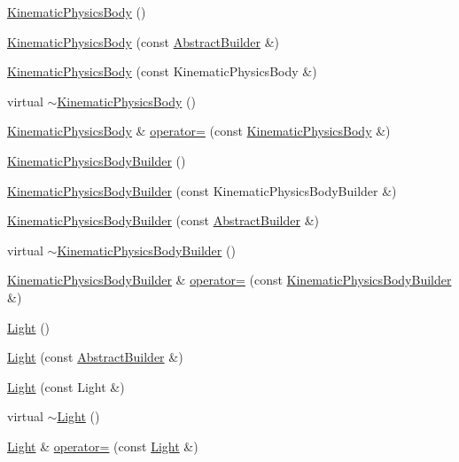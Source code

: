 \begin{DoxyCompactItemize}
\item 
\hyperlink{namespacejli_a7a3913d5239a7a26f7b249c8352cfb7e}{Kinematic\+Physics\+Body} ()
\item 
\hyperlink{namespacejli_ad12a03a0d7f868a1a84fe43d58c4c168}{Kinematic\+Physics\+Body} (const \hyperlink{classjli_1_1_abstract_builder}{Abstract\+Builder} \&)
\item 
\hyperlink{namespacejli_a5ddb3c57d768905fbeb013afc3e17197}{Kinematic\+Physics\+Body} (const Kinematic\+Physics\+Body \&)
\item 
virtual \hyperlink{namespacejli_afe5fa54bbd9c734f8154e094f50b8344}{$\sim$\+Kinematic\+Physics\+Body} ()
\item 
\hyperlink{namespacejli_a7a3913d5239a7a26f7b249c8352cfb7e}{Kinematic\+Physics\+Body} \& \hyperlink{namespacejli_a9dd32a4ec75ec13088b16fd9814601cd}{operator=} (const \hyperlink{namespacejli_a7a3913d5239a7a26f7b249c8352cfb7e}{Kinematic\+Physics\+Body} \&)
\item 
\hyperlink{namespacejli_a7c18f18400fc9c3348d7888cd25a57d7}{Kinematic\+Physics\+Body\+Builder} ()
\item 
\hyperlink{namespacejli_a41d3966b2a78be58e202899d74ba0875}{Kinematic\+Physics\+Body\+Builder} (const Kinematic\+Physics\+Body\+Builder \&)
\item 
\hyperlink{namespacejli_a50acbc03a306ce042f59e76accc35c43}{Kinematic\+Physics\+Body\+Builder} (const \hyperlink{classjli_1_1_abstract_builder}{Abstract\+Builder} \&)
\item 
virtual \hyperlink{namespacejli_a4e01e4f68c5489e4b57284f99bddba69}{$\sim$\+Kinematic\+Physics\+Body\+Builder} ()
\item 
\hyperlink{namespacejli_a7c18f18400fc9c3348d7888cd25a57d7}{Kinematic\+Physics\+Body\+Builder} \& \hyperlink{namespacejli_ab7a97bb558d975fef79c14180602daf6}{operator=} (const \hyperlink{namespacejli_a7c18f18400fc9c3348d7888cd25a57d7}{Kinematic\+Physics\+Body\+Builder} \&)
\item 
\hyperlink{namespacejli_aa743de893683a76d6d6862899d5c9c95}{Light} ()
\item 
\hyperlink{namespacejli_a4df8986faaac7b2936c1b4c2570e30ea}{Light} (const \hyperlink{classjli_1_1_abstract_builder}{Abstract\+Builder} \&)
\item 
\hyperlink{namespacejli_aa3b8b43415275515956d5c46a0715ccb}{Light} (const Light \&)
\item 
virtual \hyperlink{namespacejli_aae4231474bb8c3e59ac1454da254b3a7}{$\sim$\+Light} ()
\item 
\hyperlink{namespacejli_aa743de893683a76d6d6862899d5c9c95}{Light} \& \hyperlink{namespacejli_a7a1252c0a9ccb9ee23d13cf04ebb17dd}{operator=} (const \hyperlink{namespacejli_aa743de893683a76d6d6862899d5c9c95}{Light} \&)

\end{DoxyCompactItemize}
